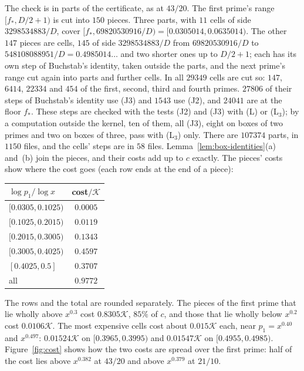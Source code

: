 \documentclass[11pt]{article}
\theoremstyle{definition}
\begin{document}
The check is in parts of the certificate, as at $43/20$. The first prime's range $[f_*, D/2 + 1)$ is cut into $150$
pieces. Three parts, with $11$ cells of side $3298534883/D$, cover $[f_*, 69820530916/D) = [0.0305014, 0.0635014)$.
The other $147$ pieces are cells, $145$ of side $3298534883/D$ from $69820530916/D$ to $548108088951/D =
0.4985014\ldots$ and two shorter ones up to $D/2 + 1$; each has its own step of Buchstab's identity, taken outside the
parts, and the next prime's range cut again into parts and further cells. In all $29349$ cells are cut so: $147$,
$6414$, $22334$ and $454$ of the first, second, third and
fourth primes. $27806$ of their steps of Buchstab's identity use (J3) and $1543$ use (J2), and $24041$ are at the floor
$f_*$. These steps are checked with the tests (J2) and (J3) with (L) or (L$_3$); by a computation outside the
kernel, ten of them, all (J3), eight on boxes of two primes and two on boxes of three, pass with (L$_3$) only. There
are $107374$ parts, in $1150$ files, and the cells' steps are in $58$ files. Lemma~\ref{lem:box-identities}(a) and~(b)
join the pieces, and their costs add up to $c$ exactly. The pieces' costs show where the cost goes (each row ends at
the end of a piece):
\begin{center}
\small
\begin{tabular}{@{}lc@{}}
\toprule
$\log p_1/\log x$ & cost$/\mathcal K$ \\
\midrule
$[0.0305, 0.1025)$ & $0.0005$ \\
$[0.1025, 0.2015)$ & $0.0119$ \\
$[0.2015, 0.3005)$ & $0.1343$ \\
$[0.3005, 0.4025)$ & $0.4597$ \\
$[0.4025, 0.5]$ & $0.3707$ \\
\midrule
all & $0.9772$ \\
\bottomrule
\end{tabular}
\end{center}
The rows and the total are rounded separately. The pieces of the first prime that lie wholly above $x^{0.3}$ cost
$0.8305\mathcal K$, $85\%$ of $c$, and those that lie wholly below $x^{0.2}$ cost $0.0106\mathcal K$. The most expensive
cells cost about $0.015\mathcal K$ each,
near $p_1 = x^{0.40}$ and $x^{0.497}$: $0.01524\mathcal K$ on $[0.3965, 0.3995)$ and $0.01547\mathcal K$ on $[0.4955,
0.4985)$. Figure~\ref{fig:cost} shows how the two costs are spread over the first prime: half of the cost lies above
$x^{0.382}$ at $43/20$ and above $x^{0.379}$ at $21/10$.
\end{document}
